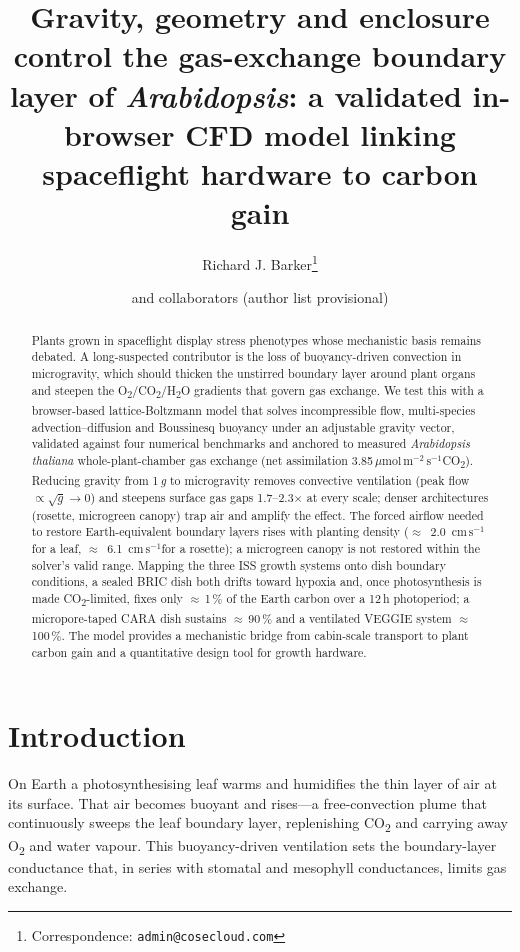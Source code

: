 \documentclass[10pt]{article}
\title{\bfseries Gravity, geometry and enclosure control the gas-exchange boundary layer of \textit{Arabidopsis}: a validated in-browser CFD model linking spaceflight hardware to carbon gain}
\author[1]{Richard J. Barker\thanks{Correspondence: \texttt{admin@cosecloud.com}}}
\author[1]{\textnormal{and collaborators (author list provisional)}}
\affil[1]{MadWest~/~AstroBotany International Research Initiative (AIRI). Affiliations to be finalised.}
\date{}
\newcommand{\ums}{\ensuremath{\mu\mathrm{mol\,m^{-2}\,s^{-1}}}}
\newcommand{\cmsu}{\ensuremath{\mathrm{cm\,s^{-1}}}}
\newcommand{\co}{CO\textsubscript{2}}
\newcommand{\oo}{O\textsubscript{2}}
\newcommand{\wo}{H\textsubscript{2}O}
\begin{document}
\maketitle

\begin{abstract}
\noindent
Plants grown in spaceflight display stress phenotypes whose mechanistic basis remains debated. A long-suspected
contributor is the loss of buoyancy-driven convection in microgravity, which should thicken the unstirred boundary
layer around plant organs and steepen the \oo/\co/\wo{} gradients that govern gas exchange. We test this with a
browser-based lattice-Boltzmann model that solves incompressible flow, multi-species advection--diffusion and
Boussinesq buoyancy under an adjustable gravity vector, validated against four numerical benchmarks and anchored to
measured \textit{Arabidopsis thaliana} whole-plant-chamber gas exchange (net assimilation 3.85\,\ums \co).
Reducing gravity from 1\,\emph{g} to microgravity removes convective ventilation (peak flow $\propto\sqrt{g}\to0$)
and steepens surface gas gaps 1.7--2.3$\times$ at every scale; denser architectures (rosette, microgreen canopy) trap
air and amplify the effect. The forced airflow needed to restore Earth-equivalent boundary layers rises with
planting density ($\approx$~2.0~\cmsu for a leaf, $\approx$~6.1~\cmsu for a rosette); a microgreen canopy is not
restored within the solver's valid range. Mapping the three ISS
growth systems onto dish boundary conditions, a sealed BRIC dish both drifts toward hypoxia and, once photosynthesis is
made \co-limited, fixes only $\approx$\,1\,\% of the Earth carbon over a 12\,h photoperiod; a micropore-taped
CARA dish sustains $\approx$\,90\,\% and a ventilated VEGGIE system $\approx$\,100\,\%. The model provides a mechanistic
bridge from cabin-scale transport to plant carbon gain and a quantitative design tool for growth hardware.
\end{abstract}

\section{Introduction}
On Earth a photosynthesising leaf warms and humidifies the thin layer of air at its surface. That air becomes buoyant
and rises---a free-convection plume that continuously sweeps the leaf boundary layer, replenishing \co{} and carrying
away \oo{} and water vapour. This buoyancy-driven ventilation sets the boundary-layer conductance that, in series with
stomatal and mesophyll conductances, limits gas exchange.
\end{document}
